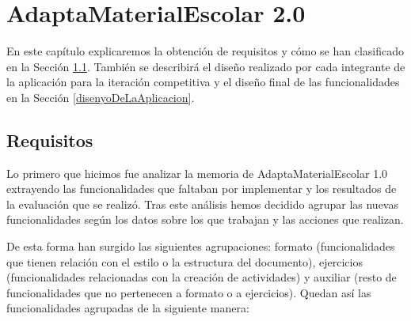 \chapter{AdaptaMaterialEscolar 2.0}
\label{cap:AdaptaMaterialEscolar2.0}
En este capítulo explicaremos la obtención de requisitos y cómo se han clasificado en la Sección \ref{cap:requisitos}. También se describirá el diseño realizado por cada integrante de la aplicación para la iteración competitiva y el diseño final de las funcionalidades en la Sección \ref{disenyoDeLaAplicacion}.

\section{Requisitos}
\label{cap:requisitos}

Lo primero que hicimos fue analizar la memoria de AdaptaMaterialEscolar 1.0 \citep*{AdaptaMaterialEscolar1.0}extrayendo las funcionalidades que faltaban por implementar y los resultados de la evaluación que se realizó. Tras este análisis hemos decidido agrupar las nuevas funcionalidades según los datos sobre los que trabajan y las acciones que realizan.

De esta forma han surgido las siguientes agrupaciones: formato (funcionalidades que tienen relación con el estilo o la estructura del documento), ejercicios (funcionalidades relacionadas con la creación de actividades) y auxiliar (resto de funcionalidades que no pertenecen a formato o a ejercicios). Quedan así las funcionalidades agrupadas de la siguiente manera:
\\

